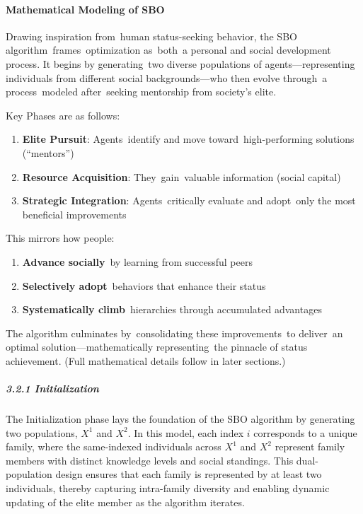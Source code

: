 \documentclass{article} %
\begin{document}
\paragraph{ Mathematical Modeling of SBO}

Drawing inspiration from~human status-seeking behavior, the SBO algorithm~frames~optimization as~both~a personal and social development process. It begins by generating~two diverse populations of agents---representing individuals from different social backgrounds---who then evolve through~a process~modeled after~seeking mentorship from society's elite.

Key Phases are as follows:

\begin{enumerate}
\item  \textbf{Elite Pursuit}: Agents~identify and move toward~high-performing solutions (``mentors'')

\item  \textbf{Resource Acquisition}: They~gain~valuable information (social capital)

\item  \textbf{Strategic Integration}: Agents~critically evaluate and adopt~only the most beneficial improvements
\end{enumerate}

This mirrors how people:

\begin{enumerate}
\item  \textbf{Advance socially}~by learning from successful peers

\item  \textbf{Selectively adopt}~behaviors that enhance their status

\item  \textbf{Systematically climb}~hierarchies through accumulated advantages
\end{enumerate}

The algorithm culminates by~consolidating these improvements~to deliver~an optimal solution---mathematically representing~the pinnacle of status achievement. (Full mathematical details follow in later sections.)

\noindent 
\subparagraph{3.2.1 Initialization}

The Initialization phase lays the foundation of the SBO algorithm by generating two populations, $X^1$ and $X^2$. In this model, each index $i$ corresponds to a unique family, where the same-indexed individuals across $X^1$ and $X^2$ represent family members with distinct knowledge levels and social standings. This dual-population design ensures that each family is represented by at least two individuals, thereby capturing intra-family diversity and enabling dynamic updating of the elite member as the algorithm iterates.
\end{document}
